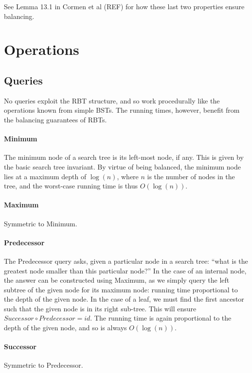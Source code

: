 \documentclass[oneside,11pt,openright]{report}
\begin{document}
See Lemma 13.1 in Cormen et al (REF) for how these last two properties
ensure balancing.

\section{Operations}

\subsection{Queries}

No queries exploit the RBT structure, and so work procedurally like the
operations known from simple BSTs. The running times, however, benefit
from the balancing guarantees of RBTs.

\paragraph{Minimum} The minimum node of a search tree is its left-most
node, if any. This is given by the basic search tree invariant. By
virtue of being balanced, the minimum node lies at a maximum depth of
$\log(n)$, where $n$ is the number of nodes in the tree, and the
worst-case running time is thus $O(\log(n))$.

\paragraph{Maximum} Symmetric to Minimum.

\paragraph{Predecessor} The Predecessor query asks, given a particular
node in a search tree: ``what is the greatest node smaller than this
particular node?'' In the case of an internal node, the answer can be
constructed using Maximum, as we simply query the left subtree of the
given node for its maximum node: running time proportional to the
depth of the given node. In the case of a leaf, we must find the first
ancestor such that the given node is in its right sub-tree. This will
ensure $Successor \circ Predecessor = id$. The running time is again
proportional to the depth of the given node, and so is always
$O(\log(n))$.

\paragraph{Successor} Symmetric to Predecessor.
\end{document}
